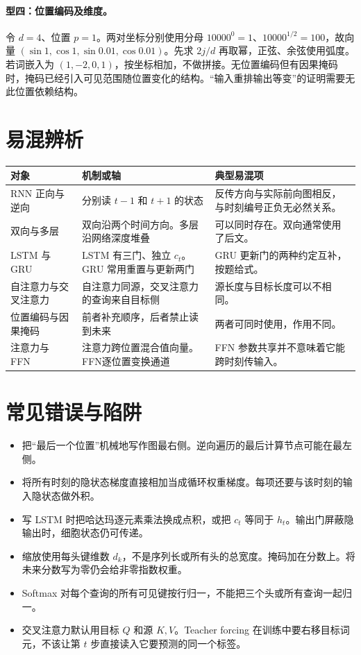 \documentclass[UTF8,a4paper,zihao=-4,fontset=fandol]{ctexrep}
\begin{document}
\paragraph{型四：位置编码及维度。}
令 $d=4$、位置 $p=1$。两对坐标分别使用分母 $10000^0=1$、$10000^{1/2}=100$，故向量 $(\sin 1,\cos 1,\sin 0.01,\cos 0.01)$。先求 $2j/d$ 再取幂，正弦、余弦使用弧度。若词嵌入为 $(1,-2,0,1)$，按坐标相加，不做拼接。无位置编码但有因果掩码时，掩码已经引入可见范围随位置变化的结构。“输入重排输出等变”的证明需要无此位置依赖结构。

\section{易混辨析}

\begin{center}
\begin{tabularx}{\linewidth}{@{}lXX@{}}
\toprule
对象 & 机制或轴 & 典型易混项\\
\midrule
RNN 正向与逆向 & 分别读 $t-1$ 和 $t+1$ 的状态 & 反传方向与实际前向图相反，与时刻编号正负无必然关系。\\
双向与多层 & 双向沿两个时间方向。多层沿网络深度堆叠 & 可以同时存在。双向通常使用了后文。\\
LSTM 与 GRU & LSTM 有三门、独立 $c_t$。GRU 常用重置与更新两门 & GRU 更新门的两种约定互补，按题给式。\\
自注意力与交叉注意力 & 自注意力同源，交叉注意力的查询来自目标侧 & 源长度与目标长度可以不相同。\\
位置编码与因果掩码 & 前者补充顺序，后者禁止读到未来 & 两者可同时使用，作用不同。\\
注意力与 FFN & 注意力跨位置混合值向量。FFN逐位置变换通道 & FFN 参数共享并不意味着它能跨时刻传输入。\\
\bottomrule
\end{tabularx}
\end{center}

\section{常见错误与陷阱}

\begin{itemize}
\item 把“最后一个位置”机械地写作图最右侧。逆向遍历的最后计算节点可能在最左侧。
\item 将所有时刻的隐状态梯度直接相加当成循环权重梯度。每项还要与该时刻的输入隐状态做外积。
\item 写 LSTM 时把哈达玛逐元素乘法换成点积，或把 $c_t$ 等同于 $h_t$。输出门屏蔽隐输出时，细胞状态仍可传递。
\item 缩放使用每头键维数 $d_k$，不是序列长或所有头的总宽度。掩码加在分数上。将未来分数写为零仍会给非零指数权重。
\item Softmax 对每个查询的所有可见键按行归一，不能把三个头或所有查询一起归一。
\item 交叉注意力默认用目标 $Q$ 和源 $K,V$。Teacher forcing 在训练中要右移目标词元，不该让第 $t$ 步直接读入它要预测的同一个标签。
\end{itemize}
\end{document}
